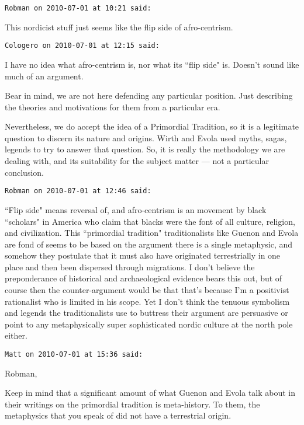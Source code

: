 \begin{footnotesize}\begin{sffamily}



\texttt{Robman on 2010-07-01 at 10:21 said: }

This nordicist stuff just seems like the flip side of afro-centrism.


\hfill

\texttt{Cologero on 2010-07-01 at 12:15 said: }

I have no idea what afro-centrism is, nor what its ``flip side" is. Doesn't sound like much of an argument.

Bear in mind, we are not here defending any particular position. Just describing the theories and motivations for them from a particular era.

Nevertheless, we do accept the idea of a Primordial Tradition, so it is a legitimate question to discern its nature and origins. Wirth and Evola used myths, sagas, legends to try to answer that question. So, it is really the methodology we are dealing with, and its suitability for the subject matter — not a particular conclusion.


\hfill

\texttt{Robman on 2010-07-01 at 12:46 said: }

``Flip side" means reversal of, and afro-centrism is an movement by black ``scholars" in America who claim that blacks were the font of all culture, religion, and civilization. This ``primordial tradition" traditionalists like Guenon and Evola are fond of seems to be based on the argument there is a single metaphysic, and somehow they postulate that it must also have originated terrestrially in one place and then been dispersed through migrations. I don't believe the preponderance of historical and archaeological evidence bears this out, but of course then the counter-argument would be that that's because I'm a positivist rationalist who is limited in his scope. Yet I don't think the tenuous symbolism and legends the traditionalists use to buttress their argument are persuasive or point to any metaphysically super sophisticated nordic culture at the north pole either.


\hfill

\texttt{Matt on 2010-07-01 at 15:36 said: }

Robman,

Keep in mind that a significant amount of what Guenon and Evola talk about in their writings on the primordial tradition is meta-history. To them, the metaphysics that you speak of did not have a terrestrial origin. 


\end{sffamily}
\end{footnotesize}
